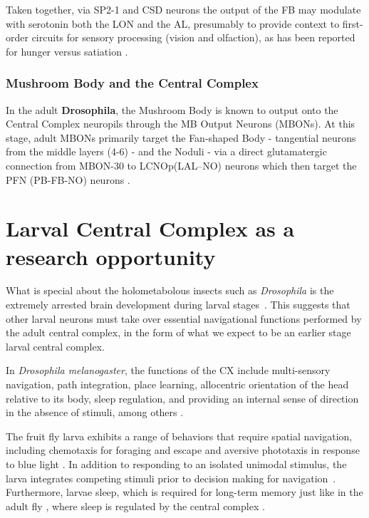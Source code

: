         Taken together, via SP2-1 and CSD neurons the output of the FB may modulate with serotonin both the LON and the AL, presumably to provide context to first-order circuits for sensory processing (vision and olfaction), as has been reported for hunger versus satiation \citep{vogt2021internalstate}.
        \subsubsection{Mushroom Body and the Central Complex}
        In the adult \textbf{Drosophila}, the Mushroom Body is known to output onto the Central Complex neuropils through the MB Output Neurons (MBONs). At this stage, adult MBONs primarily target the Fan-shaped Body - tangential neurons from the middle layers (4-6) - and the Noduli - via a direct glutamatergic connection from MBON-30 to LCNOp(LAL–NO) neurons which then target the PFN (PB-FB-NO) neurons \citep{hulse2021connectome}.


\section{Larval Central Complex as a research opportunity}
    What is special about the holometabolous insects such as \textit{Drosophila} is the extremely arrested brain development during larval stages~\citep{andrade2019developmentally}. This suggests that other larval neurons must take over essential navigational functions performed by the adult central complex, in the form of what we expect to be an earlier stage larval central complex. 

    In \textit{Drosophila melanogaster}, the functions of the CX include multi-sensory navigation, path integration, place learning, allocentric orientation of the head relative to its body, sleep regulation, and providing an internal sense of direction in the absence of stimuli, among others \citep{hanesch1989neuronal, ofstad2011visual, seelig2013feature, PfeifferHomberg2014, Stone2017CXModel, franconville2018building, heinze2018principles, szuperak2018sleep, pisokas2020head, ShaferKeene2021sleep, fisher2022flexible}.

    The fruit fly larva exhibits a range of behaviors that require spatial navigation, including chemotaxis for foraging and escape \citep{fishilevich2005chemotaxis, khurana2013olfactory, Ebrahim2015OR49, davies2015model} and aversive phototaxis in response to blue light \citep{sawin1995phototaxis, gong2009phototaxis, KeeneSprecher2012photobehavior}.
    In addition to responding to an isolated unimodal stimulus, the larva integrates competing stimuli prior to decision making for navigation~\citep{gepner2015computations}.
    Furthermore, larvae sleep, which is required for long-term memory \citep{poe2023sleepmemory} just like in the adult fly \citep{donlea2011sleep, donlea2019sleep}, where sleep is regulated by the central complex \citep{ShaferKeene2021sleep}.

